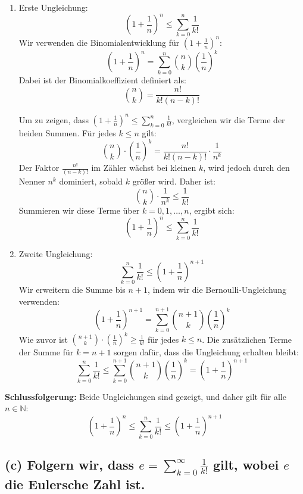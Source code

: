 \documentclass[11pt]{article}
\begin{document}
\begin{enumerate}
    \item Erste Ungleichung:
    \[
    \left( 1 + \frac{1}{n} \right)^n \leq \sum_{k=0}^n \frac{1}{k!}
    \]
    Wir verwenden die Binomialentwicklung für \(\left( 1 + \frac{1}{n} \right)^n\):
    \[
    \left( 1 + \frac{1}{n} \right)^n = \sum_{k=0}^n \binom{n}{k} \left(\frac{1}{n}\right)^k
    \]
    Dabei ist der Binomialkoeffizient definiert als:
    \[
    \binom{n}{k} = \frac{n!}{k!(n-k)!}
    \]

    Um zu zeigen, dass \(\left( 1 + \frac{1}{n} \right)^n \leq \sum_{k=0}^n \frac{1}{k!}\), vergleichen wir die Terme der beiden Summen.
    Für jedes \(k \leq n\) gilt:
    \[
    \binom{n}{k} \cdot \left(\frac{1}{n}\right)^k = \frac{n!}{k!(n-k)!} \cdot \frac{1}{n^k}
    \]
    Der Faktor \(\frac{n!}{(n-k)!}\) im Zähler wächst bei kleinen \(k\), wird jedoch durch den Nenner \(n^k\) dominiert, sobald \(k\) größer wird. Daher ist:
    \[
    \binom{n}{k} \cdot \frac{1}{n^k} \leq \frac{1}{k!}
    \]
    Summieren wir diese Terme über \(k = 0, 1, \dots, n\), ergibt sich:
    \[
    \left( 1 + \frac{1}{n} \right)^n \leq \sum_{k=0}^n \frac{1}{k!}
    \]

    \item Zweite Ungleichung:
    \[
    \sum_{k=0}^n \frac{1}{k!} \leq \left( 1 + \frac{1}{n} \right)^{n+1}
    \]
    Wir erweitern die Summe bis \(n+1\), indem wir die Bernoulli-Ungleichung verwenden:
    \[
    \left( 1 + \frac{1}{n} \right)^{n+1} = \sum_{k=0}^{n+1} \binom{n+1}{k} \left(\frac{1}{n}\right)^k
    \]
    Wie zuvor ist \(\binom{n+1}{k} \cdot \left(\frac{1}{n}\right)^k \geq \frac{1}{k!}\) für jedes \(k \leq n\). Die zusätzlichen Terme der Summe für \(k = n+1\) sorgen dafür, dass die Ungleichung erhalten bleibt:
    \[
    \sum_{k=0}^n \frac{1}{k!} \leq \sum_{k=0}^{n+1} \binom{n+1}{k} \left(\frac{1}{n}\right)^k = \left( 1 + \frac{1}{n} \right)^{n+1}
    \]
\end{enumerate}

\textbf{Schlussfolgerung:} Beide Ungleichungen sind gezeigt, und daher gilt für alle \(n \in \mathbb{N}\):
\[
\left( 1 + \frac{1}{n} \right)^n \leq \sum_{k=0}^n \frac{1}{k!} \leq \left( 1 + \frac{1}{n} \right)^{n+1}
\]


\subsection*{(c) Folgern wir, dass \(e = \sum_{k=0}^\infty \frac{1}{k!}\) gilt, wobei \(e\) die Eulersche Zahl ist.}
\end{document}
